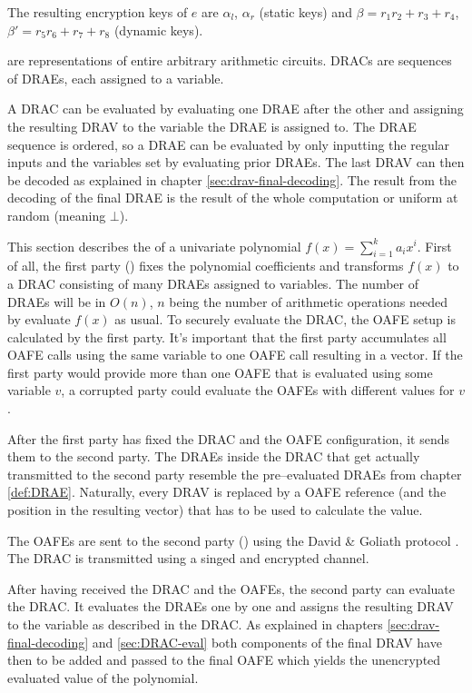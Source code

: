 \noindent{}The resulting encryption keys of $e$ are $\alpha_l$, $\alpha_r$
(static keys) and $\beta = r_1r_2 + r_3 + r_4$, $\beta' = r_5r_6 + r_7 + r_8$
(dynamic keys).



%
%
\label{sec:drac}

 are representations of entire
arbitrary arithmetic circuits. DRACs are sequences of DRAEs, each assigned to a
variable.

\label{sec:DRAC-eval}

A DRAC can be evaluated by evaluating one DRAE after the other and assigning the
resulting DRAV to the variable the DRAE is assigned to. The DRAE sequence is
ordered, so a DRAE can be evaluated by only inputting the regular inputs
and the variables set by evaluating prior DRAEs. The last DRAV can then be
decoded as explained in chapter \ref{sec:drav-final-decoding}. The result from
the decoding of the final DRAE is the result of the whole computation or uniform
at random (meaning $\bot$).


%
%
\label{sec:OPE}

This section describes the  of a
univariate polynomial $f(x) = \sum_{i=1}^k a_ix^i$. First of all, the first
party (\JWpOne{}) fixes the polynomial coefficients and transforms $f(x)$ to a
DRAC consisting of many DRAEs assigned to variables. The number of DRAEs will be
in $O(n)$, $n$ being the number of arithmetic operations needed by evaluate
$f(x)$ as usual. To securely evaluate the DRAC, the OAFE setup is calculated by
the first party. It's important that the first party accumulates all OAFE calls
using the same variable to one OAFE call resulting in a vector. If the first
party would provide more than one OAFE that is evaluated using some variable
$v$, a corrupted party could evaluate the OAFEs with different values for $v$.

After the first party has fixed the DRAC and the OAFE configuration, it sends
them to the second party. The DRAEs inside the DRAC that get actually
transmitted to the second party resemble the pre--evaluated DRAEs from chapter
\ref{def:DRAE}. Naturally, every DRAV is replaced by a OAFE reference (and the
position in the resulting vector) that has to be used to calculate the value.

The OAFEs are sent to the second party (\JWpTwo{}) using the David \& Goliath
protocol \cite{davidgoliath}. The DRAC is transmitted using a singed and
encrypted channel.

After having received the DRAC and the OAFEs, the second party can evaluate the
DRAC. It evaluates the DRAEs one by one and assigns the resulting DRAV to the
variable as described in the DRAC. As explained in chapters
\ref{sec:drav-final-decoding} and \ref{sec:DRAC-eval} both components of the
final DRAV have then to be added and passed to the final OAFE which yields the
unencrypted evaluated value of the polynomial.

